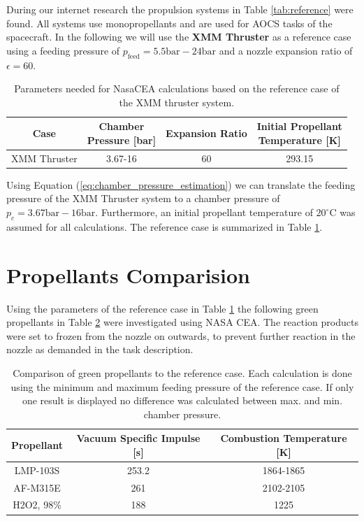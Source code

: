 \documentclass[12pt]{article}
\begin{document}
During our internet research the propulsion systems in Table \ref{tab:reference} were found. All systems use monopropellants and are used for AOCS tasks of the spacecraft. In the following we will use the \textbf{XMM Thruster} as a reference case using a feeding pressure of $p_{\text{feed}}=5.5\text{bar}-24\text{bar}$ and a nozzle expansion ratio of $\epsilon=60$.\\

\begin{table}[h!]
	\centering
	\begin{tabular}{|c|c|c|c|}
		\hline
		Case & \makecell{Chamber\\ Pressure {[}bar{]}} & Expansion Ratio & \makecell{Initial Propellant\\ Temperature {[}K{]}} \\ \hline
		XMM Thruster                      &        3.67-16         &  60   &              293.15                      \\ \hline
	\end{tabular}
	\caption{Parameters needed for NasaCEA calculations based on the reference case of the XMM thruster system.}
	\label{tab:selected_reference_case}
\end{table}

Using Equation (\ref{eq:chamber_pressure_estimation}) we can translate the feeding pressure of the XMM Thruster system to a chamber pressure of $p_{c}=3.67\text{bar}-16\text{bar}$. Furthermore, an initial propellant temperature of $20^\circ\text{C}$ was assumed for all calculations. The reference case is summarized in Table \ref{tab:selected_reference_case}.
 
\section{Propellants Comparision}
Using the parameters of the reference case in Table \ref{tab:selected_reference_case} the following green propellants in Table \ref{tab:comparison} were investigated using NASA CEA. The reaction products were set to frozen from the nozzle on outwards, to prevent further reaction in the nozzle as demanded in the task description.

\begin{table}[h]
	\centering
	\begin{tabular}{|c|c|c|}
		\hline
		Propellant & Vacuum Specific Impulse {[}s{]} & Combustion Temperature {[}K{]} \\ \hline
		LMP-103S   & 253.2 & 1864-1865  \\ \hline
		AF-M315E   & 261  & 2102-2105  \\ \hline
		H2O2, 98\% & 188   & 1225    \\ \hline     
	\end{tabular}\\
	\caption{Comparison of green propellants to the reference case. Each calculation is done using the minimum and maximum feeding pressure of the reference case. If only one result is displayed no difference was calculated between max. and min. chamber pressure.}
	\label{tab:comparison}
\end{table}
\end{document}
